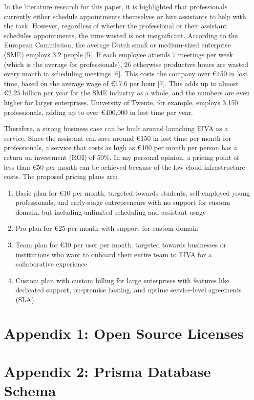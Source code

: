 \documentclass{article}
\begin{document}
In the literature research for this paper, it is highlighted that professionals currently either schedule appointments themselves or hire assistants to help with the task. However, regardless of whether the professional or their assistant schedules appointments, the time wasted is not insignificant. According to the European Commission, the average Dutch small or medium-sized enterprise (SME) employs 3.2 people [5]. If each employee attends 7 meetings per week (which is the average for professionals), 26 otherwise productive hours are wasted every month in scheduling meetings [6]. This costs the company over €450 in lost time, based on the average wage of €17.6 per hour [7]. This adds up to almost €2.25 billion per year for the SME industry as a whole, and the numbers are even higher for larger enterprises. University of Twente, for example, employs 3,150 professionals, adding up to over €400,000 in lost time per year.

Therefore, a strong business case can be built around launching EIVA as a service. Since the assistant can save around €150 in lost time per month for professionals, a service that costs as high as €100 per month per person has a return on investment (ROI) of 50\%. In my personal opinion, a pricing point of less than €50 per month can be achieved because of the low cloud infrastructure costs. The proposed pricing plans are:

\begin{enumerate}
	\item Basic plan for €10 per month, targeted towards students, self-employed young professionals, and early-stage entrepreneurs with no support for custom domain, but including unlimited scheduling and assistant usage
	\item Pro plan for €25 per month with support for custom domain
	\item Team plan for €30 per user per month, targeted towards businesses or institutions who want to onboard their entire team to EIVA for a collaborative experience
	\item Custom plan with custom billing for large enterprises with features like dedicated support, on-premise hosting, and uptime service-level agreements (SLA)
\end{enumerate}

\newpage

\section*{Appendix 1: Open Source Licenses}

\newpage

\section*{Appendix 2: Prisma Database Schema}

\newpage



\end{document}

